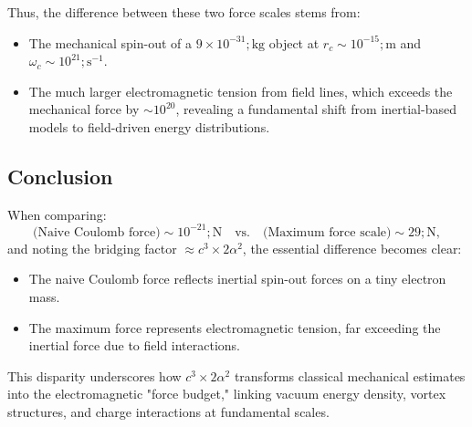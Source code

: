 Thus, the difference between these two force scales stems from:
\begin{itemize}
\item The mechanical spin-out of a $9 \times 10^{-31} ; \mathrm{kg}$ object at $r_c \sim 10^{-15} ; \mathrm{m}$ and $\omega_c \sim 10^{21} ; \mathrm{s^{-1}}$.
\item The much larger electromagnetic tension from field lines, which exceeds the mechanical force by $\sim 10^{20}$, revealing a fundamental shift from inertial-based models to field-driven energy distributions.
\end{itemize}


\subsection*{Conclusion}


When comparing:
\begin{equation*}
\text{(Naive Coulomb force)} \sim 10^{-21} ; \mathrm{N} \quad \text{vs.} \quad \text{(Maximum force scale)} \sim 29 ; \mathrm{N},
\end{equation*}
and noting the bridging factor $\approx c^3 \times 2 \alpha^2$, the essential difference becomes clear:
\begin{itemize}
\item The naive Coulomb force reflects inertial spin-out forces on a tiny electron mass.
\item The maximum force represents electromagnetic tension, far exceeding the inertial force due to field interactions.
\end{itemize}
This disparity underscores how $c^3 \times 2 \alpha^2$ transforms classical mechanical estimates into the electromagnetic "force budget," linking vacuum energy density, vortex structures, and charge interactions at fundamental scales.

